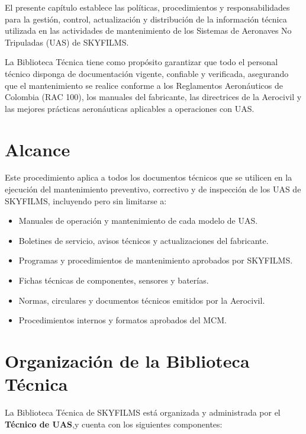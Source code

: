 El presente capítulo establece las políticas, procedimientos y responsabilidades para la gestión, control, actualización y distribución de la información técnica utilizada en las actividades de mantenimiento de los Sistemas de Aeronaves No Tripuladas (UAS) de SKYFILMS.

La Biblioteca Técnica tiene como propósito garantizar que todo el personal técnico disponga de documentación vigente, confiable y verificada, asegurando que el mantenimiento se realice conforme a los Reglamentos Aeronáuticos de Colombia (RAC 100), los manuales del fabricante, las directrices de la Aerocivil y las mejores prácticas aeronáuticas aplicables a operaciones con UAS.

\section{Alcance}
Este procedimiento aplica a todos los documentos técnicos que se utilicen en la ejecución del mantenimiento preventivo, correctivo y de inspección de los UAS de SKYFILMS, incluyendo pero sin limitarse a:

\begin{itemize}
    \item Manuales de operación y mantenimiento de cada modelo de UAS.

    \item Boletines de servicio, avisos técnicos y actualizaciones del fabricante.

    \item Programas y procedimientos de mantenimiento aprobados por SKYFILMS.

    \item Fichas técnicas de componentes, sensores y baterías.

    \item Normas, circulares y documentos técnicos emitidos por la Aerocivil.

    \item Procedimientos internos y formatos aprobados del MCM.
\end{itemize}

\section{Organización de la Biblioteca Técnica}
La Biblioteca Técnica de SKYFILMS está organizada y administrada por el \textbf{Técnico de UAS},y cuenta con los siguientes componentes:

